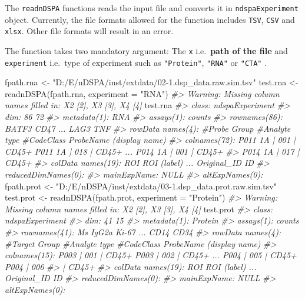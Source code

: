 \documentclass[]{article}
\newcommand{\hlstr}[1]{\textcolor[rgb]{0.251,0.627,0.251}{#1}}%
\newcommand{\hlcom}[1]{\textcolor[rgb]{0.502,0.502,0.502}{\textit{#1}}}%
\newcommand{\hlstd}[1]{\textcolor[rgb]{0.251,0.251,0.251}{#1}}%
\newenvironment{Shaded}{\begin{myshaded}}{\end{myshaded}}
\newcommand{\StringTok}[1]{\hlstr{#1}}
\newcommand{\CommentTok}[1]{\hlcom{#1}}
\newcommand{\OtherTok}[1]{{#1}}
\newcommand{\FunctionTok}[1]{\hlstd{#1}}
\newcommand{\AttributeTok}[1]{{#1}}
\newcommand{\NormalTok}[1]{\hlstd{#1}}
\begin{document}
The \texttt{readnDSPA} functions reads the input file and converts it in
\texttt{ndspaExperiment} object. Currently, the file formats allowed for the function
includes \texttt{TSV}, \texttt{CSV} and \texttt{xlsx}. Other file formats will result in an error.

The function takes two mandatory argument: The \texttt{x} i.e.~\textbf{path of the file}
and \texttt{experiment} i.e.~type of experiment such as \texttt{"Protein"}, \texttt{"RNA"} or \texttt{"CTA"}
.

\begin{Shaded}
\begin{Highlighting}[]
\NormalTok{fpath.rna }\OtherTok{\textless{}{-}} \StringTok{"D:/E/nDSPA/inst/extdata/02{-}1.dsp\_data.raw.sim.tsv"}
\NormalTok{test.rna }\OtherTok{\textless{}{-}} \FunctionTok{readnDSPA}\NormalTok{(fpath.rna, }\AttributeTok{experiment =} \StringTok{"RNA"}\NormalTok{)}
\CommentTok{\#\textgreater{} Warning: Missing column names filled in: \textquotesingle{}X2\textquotesingle{} [2], \textquotesingle{}X3\textquotesingle{} [3], \textquotesingle{}X4\textquotesingle{} [4]}
\NormalTok{test.rna}
\CommentTok{\#\textgreater{} class: ndspaExperiment }
\CommentTok{\#\textgreater{} dim: 86 72 }
\CommentTok{\#\textgreater{} metadata(1): RNA}
\CommentTok{\#\textgreater{} assays(1): counts}
\CommentTok{\#\textgreater{} rownames(86): BATF3 CD47 ... LAG3 TNF}
\CommentTok{\#\textgreater{} rowData names(4): \#Probe Group \#Analyte type \#CodeClass ProbeName (display name)}
\CommentTok{\#\textgreater{} colnames(72): P011 1A | 001 | CD45+ P011 1A | 018 | CD45+ ... P014 1A | 001 | CD45+}
\CommentTok{\#\textgreater{}   P014 1A | 017 | CD45+}
\CommentTok{\#\textgreater{} colData names(19): ROI ROI (label) ... Original\_ID ID}
\CommentTok{\#\textgreater{} reducedDimNames(0):}
\CommentTok{\#\textgreater{} mainExpName: NULL}
\CommentTok{\#\textgreater{} altExpNames(0):}
\NormalTok{fpath.prot }\OtherTok{\textless{}{-}} \StringTok{"D:/E/nDSPA/inst/extdata/03{-}1.dsp\_data.prot.raw.sim.tsv"}
\NormalTok{test.prot }\OtherTok{\textless{}{-}} \FunctionTok{readnDSPA}\NormalTok{(fpath.prot, }\AttributeTok{experiment =} \StringTok{"Protein"}\NormalTok{)}
\CommentTok{\#\textgreater{} Warning: Missing column names filled in: \textquotesingle{}X2\textquotesingle{} [2], \textquotesingle{}X3\textquotesingle{} [3], \textquotesingle{}X4\textquotesingle{} [4]}
\NormalTok{test.prot}
\CommentTok{\#\textgreater{} class: ndspaExperiment }
\CommentTok{\#\textgreater{} dim: 41 15 }
\CommentTok{\#\textgreater{} metadata(1): Protein}
\CommentTok{\#\textgreater{} assays(1): counts}
\CommentTok{\#\textgreater{} rownames(41): Ms IgG2a Ki{-}67 ... CD14 CD34}
\CommentTok{\#\textgreater{} rowData names(4): \#Target Group \#Analyte type \#CodeClass ProbeName (display name)}
\CommentTok{\#\textgreater{} colnames(15): P003 | 001 | CD45+ P003 | 002 | CD45+ ... P004 | 005 | CD45+ P004 | 006}
\CommentTok{\#\textgreater{}   | CD45+}
\CommentTok{\#\textgreater{} colData names(19): ROI ROI (label) ... Original\_ID ID}
\CommentTok{\#\textgreater{} reducedDimNames(0):}
\CommentTok{\#\textgreater{} mainExpName: NULL}
\CommentTok{\#\textgreater{} altExpNames(0):}
\end{Highlighting}
\end{Shaded}
\end{document}

